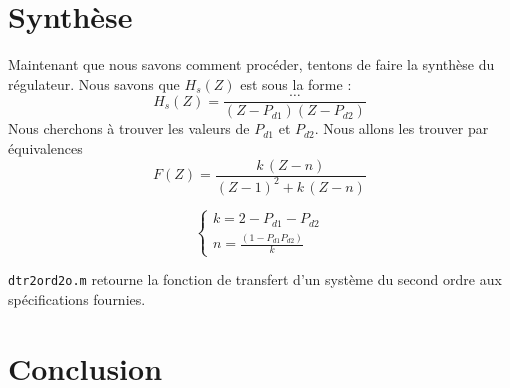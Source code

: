\section{Synthèse}
Maintenant que nous savons comment procéder, tentons de faire la synthèse du régulateur.
Nous savons que $H_s(Z)$ est sous la forme :
\begin{equation}
	H_s(Z) = \frac{\dots}{(Z-P_{d1})(Z-P_{d2})}
\end{equation}
Nous cherchons à trouver les valeurs de $P_{d1}$ et $P_{d2}$.
Nous allons les trouver par équivalences
\begin{equation}
	F(Z) = \frac{k\,(Z-n)}{(Z-1)^2+k\,(Z-n)}
\end{equation}

\begin{equation}
	\begin{cases}
		k = 2-P_{d1}-P_{d2} \\[2mm]
		n = \frac{(1-P_{d1}P_{d2})}{k}
	\end{cases}
\end{equation}


\texttt{dtr2ord2o.m} retourne la fonction de transfert d'un système du second ordre aux spécifications fournies.

\section{Conclusion}
